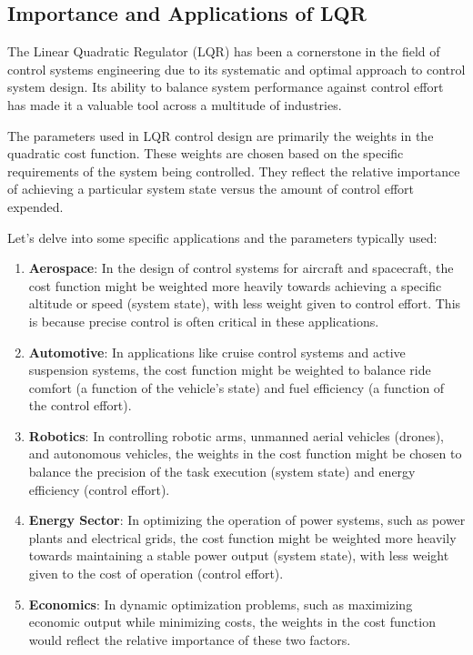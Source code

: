 \documentclass[11pt,twocolumn,twoside,lineno]{pnas-new}
\begin{document}
\subsection{Importance and Applications of LQR}
The Linear Quadratic Regulator (LQR) has been a cornerstone in the field of control systems engineering due to its systematic and optimal approach to control system design. Its ability to balance system performance against control effort has made it a valuable tool across a multitude of industries.

The parameters used in LQR control design are primarily the weights in the quadratic cost function. These weights are chosen based on the specific requirements of the system being controlled. They reflect the relative importance of achieving a particular system state versus the amount of control effort expended.

Let's delve into some specific applications and the parameters typically used:

\begin{enumerate}
       \item \textbf{Aerospace}: In the design of control systems for aircraft and spacecraft, the cost function might be weighted more heavily towards achieving a specific altitude or speed (system state), with less weight given to control effort. This is because precise control is often critical in these applications.
       \item \textbf{Automotive}: In applications like cruise control systems and active suspension systems, the cost function might be weighted to balance ride comfort (a function of the vehicle's state) and fuel efficiency (a function of the control effort).
       \item \textbf{Robotics}: In controlling robotic arms, unmanned aerial vehicles (drones), and autonomous vehicles, the weights in the cost function might be chosen to balance the precision of the task execution (system state) and energy efficiency (control effort).
       \item \textbf{Energy Sector}: In optimizing the operation of power systems, such as power plants and electrical grids, the cost function might be weighted more heavily towards maintaining a stable power output (system state), with less weight given to the cost of operation (control effort).
       \item \textbf{Economics}: In dynamic optimization problems, such as maximizing economic output while minimizing costs, the weights in the cost function would reflect the relative importance of these two factors.
\end{enumerate}
\end{document}
